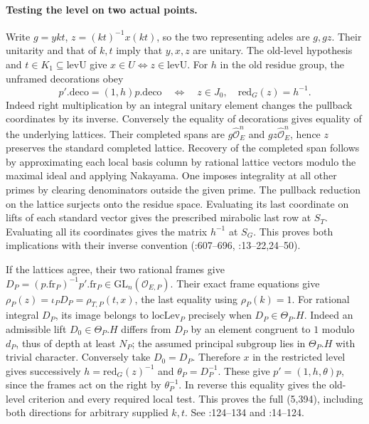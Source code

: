 \paragraph{Testing the level on two actual points.}\label{r13:s9-twopoints}
Write $g=ykt$, $z=(kt)^{-1}x(kt)$, so the two representing adeles are
$g,gz$. Their unitarity and that of $k,t$ imply that $y,x,z$ are
unitary. The old-level hypothesis and $t\in K_1\subseteq\mathrm{levU}$
give $x\in U\iff z\in\mathrm{levU}$. For $h$ in the old residue group,
the unframed decorations obey
\[
 p'.\mathrm{deco}=(1,h)p.\mathrm{deco}
 \quad\Longleftrightarrow\quad z\in J_0,\quad\mathrm{red}_G(z)=h^{-1}.
\]
Indeed right multiplication by an integral unitary element changes
the pullback coordinates by its inverse. Conversely the equality of
decorations gives equality of the underlying lattices. Their completed
spans are $g\widehat{\mathcal O}_E^n$ and
$gz\widehat{\mathcal O}_E^n$, hence $z$ preserves the standard
completed lattice. Recovery of the completed span follows by
approximating each local basis column by rational lattice vectors
modulo the maximal ideal and applying Nakayama. One imposes integrality
at all other primes by clearing denominators outside the given prime.
The pullback reduction on the lattice surjects onto the residue
space. Evaluating its last coordinate on lifts of each standard
vector gives the prescribed mirabolic last row at $S_T$. Evaluating
all its coordinates gives the matrix $h^{-1}$ at $S_G$.
This proves both implications with their inverse convention
(:607--696, :13--22,24--50).

If the lattices agree, their two rational frames give
$D_P=(p.\mathrm{fr}_P)^{-1}p'.\mathrm{fr}_P\in
\mathrm{GL}_n(\mathcal O_{E,P})$. Their exact frame equations give
$\rho_P(z)=\iota_P D_P=\rho_{T,P}(t,x)$, the last equality using
$\rho_P(k)=1$. For rational integral $D_P$, its image belongs to
$\mathrm{locLev}_P$ precisely when $D_P\in\Theta_P.H$.
Indeed an admissible lift $D_0\in\Theta_P.H$ differs from $D_P$ by
an element congruent to $1$ modulo $d_P$, thus of depth at least $N_P$;
the assumed principal subgroup lies in $\Theta_P.H$ with trivial
character. Conversely take $D_0=D_P$.
Therefore $x$ in the restricted level gives successively
$h=\mathrm{red}_G(z)^{-1}$ and $\theta_P=D_P^{-1}$. These give
$p'=(1,h,\theta)p$, since the frames act on the right by
$\theta_P^{-1}$. In reverse this equality gives the old-level
criterion and every required local test. This proves the full
 (5,394),
including both directions for arbitrary supplied $k,t$.
See :124--134 and
:14--124.

